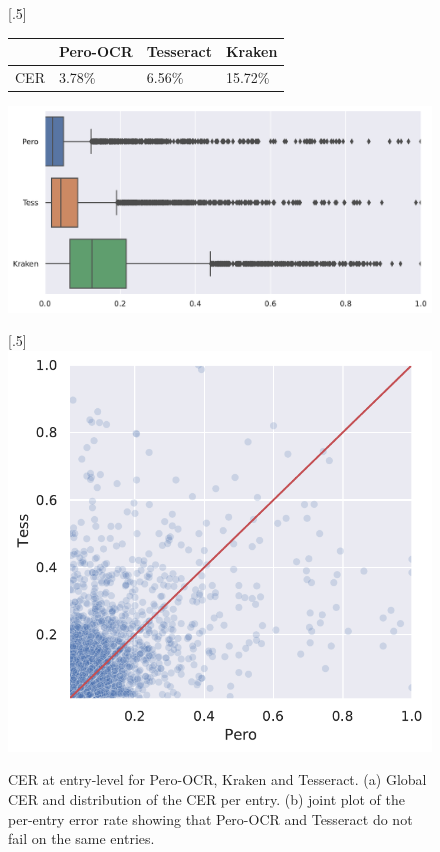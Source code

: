 \begin{figure}

\subcaptionbox{}[.5\linewidth]{
\begin{tabular}{rlll}
\toprule
 & Pero-OCR  & Tesseract & Kraken \\    
\midrule
CER & 3.78\% & 6.56\% & 15.72\% \\  
\bottomrule
\end{tabular}
\bigskip

\includegraphics[width=\linewidth]{images/ocr-eval-2.pdf}
\medskip
}
\subcaptionbox{}[.5\linewidth]{
\includegraphics[width=\linewidth]{images/ocr-eval-1.pdf}
}
\caption{CER at entry-level for Pero-OCR, Kraken and Tesseract. (a) Global CER and distribution of the CER per entry. (b)
joint plot of the per-entry error rate showing that Pero-OCR and Tesseract do not fail on the same entries.}  
\label{fig.ocr-results}
\end{figure}


